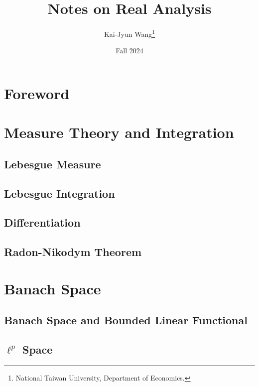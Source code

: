 \documentclass[a4paper, 12pt]{article}
\title{Notes on Real Analysis}
\author{Kai-Jyun Wang\thanks{National Taiwan University, Department of Economics.}}
\date{Fall 2024}
\begin{document}
 
\maketitle

\section*{Foreword}


\newpage
\tableofcontents
\newpage

\section{Measure Theory and Integration}

\subsection{Lebesgue Measure}


\subsection{Lebesgue Integration}


\subsection{Differentiation}


\subsection{Radon-Nikodym Theorem}


\newpage

\section{Banach Space}

\subsection{Banach Space and Bounded Linear Functional}


\subsection{$\ell^p$ Space}

\end{document}
